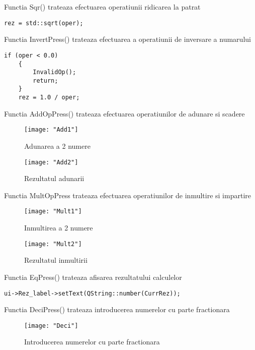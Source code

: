 \begin{itemize}
Functia Sqr() trateaza efectuarea operatiunii ridicarea la patrat

\begin{lstlisting}
rez = std::sqrt(oper);
\end{lstlisting}

Functia InvertPress() trateaza efectuarea a operatiunii de inversare a numarului

\begin{lstlisting}
if (oper < 0.0)
	{
		InvalidOp();
		return;
	}
	rez = 1.0 / oper;
\end{lstlisting}

Functia AddOpPress() trateaza efectuarea operatiunilor de adunare si scadere

	\begin{figure}[h!]
			\centering
 			 \texttt{[image: "Add1"]}
 			 \caption{Adunarea a 2 numere}
 			 \label{fig:Calcui}
		\end{figure}
		
	\begin{figure}[h!]
			\centering
 			 \texttt{[image: "Add2"]}
 			 \caption{Rezultatul adunarii}
 			 \label{fig:Calcui}
		\end{figure}

Functia MultOpPress trateaza efectuarea operatiunilor de inmultire si impartire

	\begin{figure}[h!]
			\centering
 			 \texttt{[image: "Mult1"]}
 			 \caption{Inmultirea a 2 numere}
 			 \label{fig:Calcui}
		\end{figure}
		
	\begin{figure}[h!]
			\centering
 			 \texttt{[image: "Mult2"]}
 			 \caption{Rezultatul inmultirii}
 			 \label{fig:Calcui}
		\end{figure}
\newpage
Functia EqPress() trateaza afisarea rezultatului calculelor

\begin{lstlisting}
ui->Rez_label->setText(QString::number(CurrRez));
\end{lstlisting}

Functia DeciPress() trateaza introducerea numerelor cu parte fractionara

	\begin{figure}[h!]
			\centering
 			 \texttt{[image: "Deci"]}
 			 \caption{Introducerea numerelor cu parte fractionara}
 			 \label{fig:Calcui}
		\end{figure}
		

\end{itemize}
